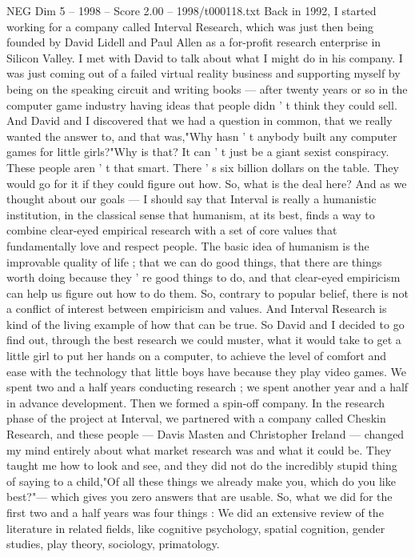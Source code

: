 \begin{textsample}{NEG Dim 5 – 1998 – Score 2.00 – 1998/t000118.txt}  \label{ex:f5_neg_070}
Back in 1992, I started working for a company called Interval Research, which was just then being founded by David Lidell and Paul Allen as a for-profit research enterprise in Silicon Valley.
I met with David to talk about what I might do in his company.
I was just coming out of a failed virtual reality business and supporting myself by being on the speaking circuit and writing books — after twenty years or so in the computer game industry having ideas that people didn ' t think they could sell.
And David and I discovered that we had a question in common, that we really wanted the answer to, and that was,"Why hasn ' t anybody built any computer games for little girls?"Why is that?
It can ' t just be a giant sexist conspiracy.
These people aren ' t that smart.
There ' s six billion dollars on the table.
They would go for it if they could figure out how.
So, what is the deal here?
And as we thought about our goals — I should say that Interval is really a humanistic institution, in the classical sense that humanism, at its best, finds a way to combine clear-eyed empirical research with a set of core values that fundamentally love and respect people.
The basic idea of humanism is the improvable quality of life ; that we can do good things, that there are things worth doing because they ' re good things to do, and that clear-eyed empiricism can help us figure out how to do them.
So, contrary to popular belief, there is not a conflict of interest between empiricism and values.
And Interval Research is kind of the living example of how that can be true.
So David and I decided to go find out, through the best research we could muster, what it would take to get a little girl to put her hands on a computer, to achieve the level of comfort and ease with the technology that little boys have because they play video games.
We spent two and a half years conducting research ; we spent another year and a half in advance development.
Then we formed a spin-off company.
In the research phase of the project at Interval, we partnered with a company called Cheskin Research, and these people — Davis Masten and Christopher Ireland — changed my mind entirely about what market research was and what it could be.
They taught me how to look and see, and they did not do the incredibly stupid thing of saying to a child,"Of all these things we already make you, which do you like best?"— which gives you zero answers that are usable.
So, what we did for the first two and a half years was four things : We did an extensive review of the literature in related fields, like cognitive psychology, spatial cognition, gender studies, play theory, sociology, primatology.

\end{textsample}
